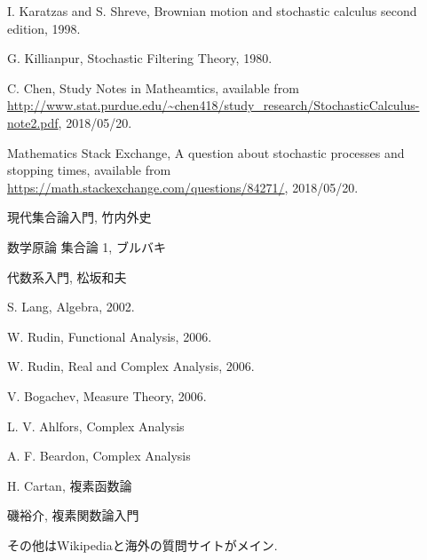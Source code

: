 \begin{thebibliography}{数字}
	 I. Karatzas and S. Shreve, Brownian motion and stochastic calculus second edition, 1998.
	
	 G. Killianpur, Stochastic Filtering Theory, 1980. 
	
	 C. Chen, Study Notes in Matheamtics, available from \url{http://www.stat.purdue.edu/~chen418/study_research/StochasticCalculus-note2.pdf}, 2018/05/20.

	 Mathematics Stack Exchange, A question about stochastic processes and stopping times, available from \url{https://math.stackexchange.com/questions/84271/}, 2018/05/20.
	
	 現代集合論入門, 竹内外史
	
	 数学原論 集合論 1, ブルバキ
	
	 代数系入門, 松坂和夫
	
	 S. Lang, Algebra, 2002.
	
	 W. Rudin, Functional Analysis, 2006.
	
	 W. Rudin, Real and Complex Analysis, 2006.
	
	 V. Bogachev, Measure Theory, 2006.
	
	 L. V. Ahlfors, Complex Analysis
	
	 A. F. Beardon, Complex Analysis
	
	 H. Cartan, 複素函数論
	
	 磯裕介, 複素関数論入門
	
	 その他はWikipediaと海外の質問サイトがメイン.
\end{thebibliography}